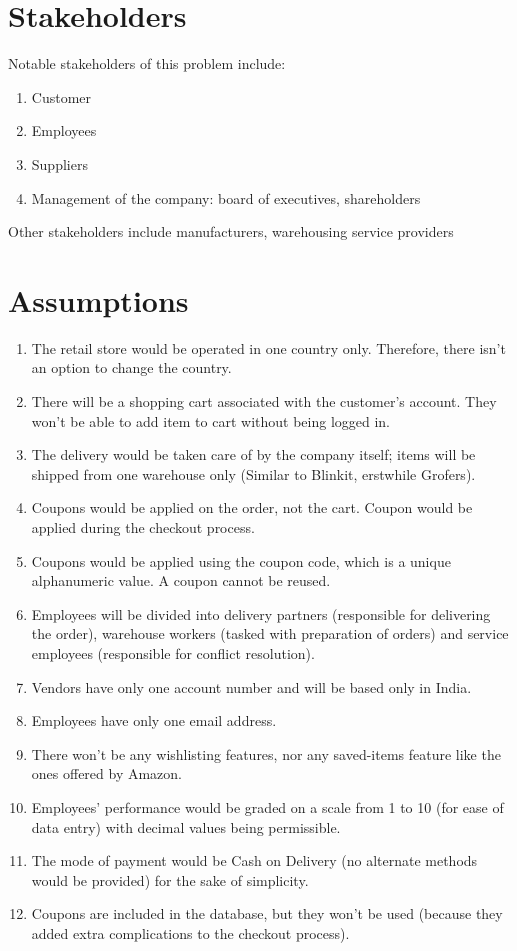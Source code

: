 \documentclass[12pt]{report}
\begin{document}
    \section{Stakeholders}
    Notable stakeholders of this problem include:
    \begin{enumerate}
        \item Customer
        \item Employees
        \item Suppliers
        \item Management of the company: board of executives, shareholders
    \end{enumerate}
    Other stakeholders include manufacturers, warehousing service providers
    
    \section{Assumptions}
    \begin{enumerate}
        \item The retail store would be operated in one country only. Therefore, there isn't an option to change the country.
        \item There will be a shopping cart associated with the customer's account. They won't be able to add item to cart without being logged in.
        \item The delivery would be taken care of by the company itself; items will be shipped from one warehouse only (Similar to Blinkit, erstwhile Grofers).
        \item Coupons would be applied on the order, not the cart. Coupon would be applied during the checkout process.
        \item Coupons would be applied using the coupon code, which is a unique alphanumeric value. A coupon cannot be reused.
        \item Employees will be divided into delivery partners (responsible for delivering the order), warehouse workers (tasked with preparation of orders) and service employees (responsible for conflict resolution).
        \item Vendors have only one account number and will be based only in India.
        \item Employees have only one email address.
        \item There won't be any wishlisting features, nor any saved-items feature like the ones offered by Amazon.
        \item Employees' performance would be graded on a scale from 1 to 10 (for ease of data entry) with decimal values being permissible.
        \item The mode of payment would be Cash on Delivery (no alternate methods would be provided) for the sake of simplicity.
        \item Coupons are included in the database, but they won't be used (because they added extra complications to the checkout process).
    \end{enumerate}
\end{document}
